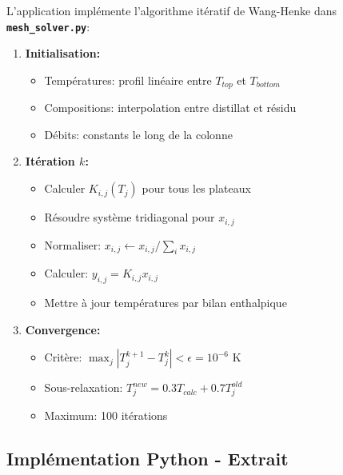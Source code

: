 \documentclass[11pt,a4paper]{article}
\newcommand{\file}[1]{\texttt{\textbf{#1}}}
\begin{document}
L'application implémente l'algorithme itératif de Wang-Henke dans \file{mesh\_solver.py}:

\begin{enumerate}[leftmargin=*]
    \item \textbf{Initialisation:}
    \begin{itemize}
        \item Températures: profil linéaire entre $T_{top}$ et $T_{bottom}$
        \item Compositions: interpolation entre distillat et résidu
        \item Débits: constants le long de la colonne
    \end{itemize}

    \item \textbf{Itération $k$:}
    \begin{itemize}
        \item Calculer $K_{i,j}(T_j)$ pour tous les plateaux
        \item Résoudre système tridiagonal pour $x_{i,j}$
        \item Normaliser: $x_{i,j} \leftarrow x_{i,j}/\sum_i x_{i,j}$
        \item Calculer: $y_{i,j} = K_{i,j} x_{i,j}$
        \item Mettre à jour températures par bilan enthalpique
    \end{itemize}

    \item \textbf{Convergence:}
    \begin{itemize}
        \item Critère: $\max_j |T_j^{k+1} - T_j^k| < \epsilon = 10^{-6}$ K
        \item Sous-relaxation: $T_j^{new} = 0.3 T_{calc} + 0.7 T_j^{old}$
        \item Maximum: 100 itérations
    \end{itemize}
\end{enumerate}

\subsection{Implémentation Python - Extrait}
\end{document}
